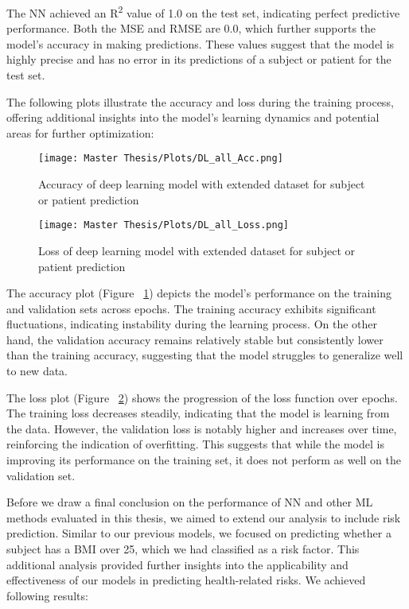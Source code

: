The NN achieved an R\textsuperscript{2} value of 1.0 on the test set, indicating perfect predictive performance. Both the MSE and RMSE are 0.0, which further supports the model's accuracy in making predictions. These values suggest that the model is highly precise and has no error in its predictions of a subject or patient for the test set.

The following plots illustrate the accuracy and loss during the training process, offering additional insights into the model's learning dynamics and potential areas for further optimization:

\FloatBarrier
\begin{figure}[h!]
    \centering
    \texttt{[image: Master Thesis/Plots/DL\_all\_Acc.png]}
    \caption{Accuracy of deep learning model with extended dataset for subject or patient prediction}
\label{figure:modelaccNNalldata}
\end{figure}
\FloatBarrier

\FloatBarrier
\begin{figure}[h!]
\centering
    \texttt{[image: Master Thesis/Plots/DL\_all\_Loss.png]}
    \caption{Loss of deep learning model with extended dataset for subject or patient prediction}
\label{figure:modellossNNalldat}
\end{figure}
\FloatBarrier

The accuracy plot (Figure ~\ref{figure:modelaccNNalldata}) depicts the model's performance on the training and validation sets across epochs. The training accuracy exhibits significant fluctuations, indicating instability during the learning process. On the other hand, the validation accuracy remains relatively stable but consistently lower than the training accuracy, suggesting that the model struggles to generalize well to new data.

The loss plot (Figure ~\ref{figure:modellossNNalldat}) shows the progression of the loss function over epochs. The training loss decreases steadily, indicating that the model is learning from the data. However, the validation loss is notably higher and increases over time, reinforcing the indication of overfitting. This suggests that while the model is improving its performance on the training set, it does not perform as well on the validation set.

Before we draw a final conclusion on the performance of NN and other ML methods evaluated in this thesis, we aimed to extend our analysis to include risk prediction. Similar to our previous models, we focused on predicting whether a subject has a BMI over 25, which we had classified as a risk factor. This additional analysis provided further insights into the applicability and effectiveness of our models in predicting health-related risks. We achieved following results:

